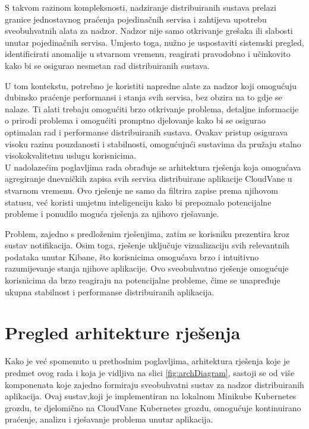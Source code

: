 \documentclass[times, utf8, diplomski]{fer}
\begin{document}
S takvom razinom kompleksnosti, nadziranje distribuiranih sustava prelazi granice jednostavnog praćenja pojedinačnih servisa i zahtijeva upotrebu sveobuhvatnih alata za nadzor. Nadzor nije samo otkrivanje grešaka ili slabosti unutar pojedinačnih servisa. Umjesto toga, nužno je uspostaviti sistemski pregled, identificirati anomalije u stvarnom vremenu, reagirati pravodobno i učinkovito kako bi se osigurao nesmetan rad distribuiranih sustava.

U tom kontekstu, potrebno je koristiti napredne alate za nadzor koji omogućuju dubinsko praćenje performansi i stanja svih servisa, bez obzira na to gdje se nalaze. Ti alati trebaju omogućiti brzo otkrivanje problema, detaljne informacije o prirodi problema i omogućiti promptno djelovanje kako bi se osigurao optimalan rad i performanse distribuiranih sustava. Ovakav pristup osigurava visoku razinu pouzdanosti i stabilnosti, omogućujući sustavima da pružaju stalno visokokvalitetnu uslugu korisnicima.\\

U nadolazećim poglavljima rada obrađuje se arhitektura rješenja koja omogućava agregiranje dnevničkih zapisa svih servisa distribuirane aplikacije CloudVane u stvarnom vremenu. Ovo rješenje ne samo da filtrira zapise prema njihovom statusu, već koristi umjetnu inteligenciju kako bi prepoznalo potencijalne probleme i ponudilo moguća rješenja za njihovo rješavanje.

Problem, zajedno s predloženim rješenjima, zatim se korisniku prezentira kroz sustav notifikacija. Osim toga, rješenje uključuje vizualizaciju svih relevantnih podataka unutar Kibane, što korisnicima omogućava brzo i intuitivno razumijevanje stanja njihove aplikacije. Ovo sveobuhvatno rješenje omogućuje korisnicima da brzo reagiraju na potencijalne probleme, čime se unapređuje ukupna stabilnost i performanse distribuiranih aplikacija.

\section{Pregled arhitekture rješenja}

Kako je već spomenuto u prethodnim poglavljima, arhitektura rješenja koje je predmet ovog rada i koja je vidljiva na slici \ref{fig:archDiagram}, sastoji se od više komponenata koje zajedno formiraju sveobuhvatni sustav za nadzor distribuiranih aplikacija. Ovaj sustav,koji je implementiran na lokalnom Minikube Kubernetes grozdu, te djelomično na CloudVane Kubernetes grozdu, omogućuje kontinuirano praćenje, analizu i rješavanje problema unutar aplikacija.\\
\end{document}

